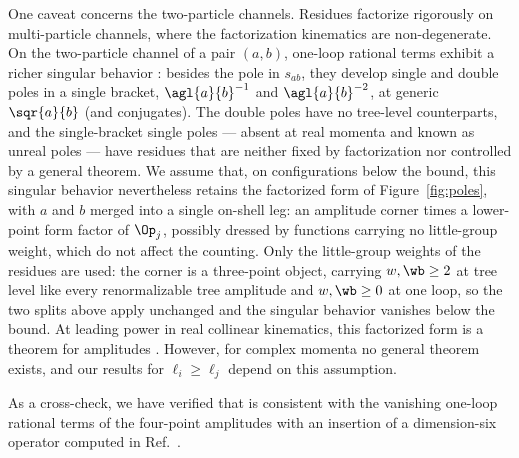 One caveat concerns the two-particle channels.
Residues factorize rigorously on multi-particle channels, where the factorization kinematics are non-degenerate.
On the two-particle channel of a pair $(a,b)$, one-loop rational terms exhibit a richer singular behavior \cite{Bern:2005hs,Bern:2005ji,Bern:2005cq}: besides the pole in $s_{ab}$, they develop single and double poles in a single bracket, $\agl{a}{b}^{-1}$ and $\agl{a}{b}^{-2}$, at generic $\sqr{a}{b}$ (and conjugates).
The double poles have no tree-level counterparts, and the single-bracket single poles --- absent at real momenta and known as unreal poles --- have residues that are neither fixed by factorization nor controlled by a general theorem.
We assume that, on configurations below the bound, this singular behavior nevertheless retains the factorized form of Figure~\ref{fig:poles}, with $a$ and $b$ merged into a single on-shell leg: an amplitude corner times a lower-point form factor of $\Op_j$, possibly dressed by functions carrying no little-group weight, which do not affect the counting.
Only the little-group weights of the residues are used: the corner is a three-point object, carrying $w,\wb \ge 2$ at tree level like every renormalizable tree amplitude and $w,\wb \ge 0$ at one loop, so the two splits above apply unchanged and the singular behavior vanishes below the bound.
At leading power in real collinear kinematics, this factorized form is a theorem for amplitudes \cite{Bern:1995ix,Kosower:1999xi}. However, for complex momenta no general theorem exists, and our results for $\ell_i \ge \ell_j$ depend on this assumption.

As a cross-check, we have verified that  is consistent with the vanishing one-loop rational terms of the four-point amplitudes with an insertion of a dimension-six operator computed in Ref.~\cite{Craig:2019wmo}.

